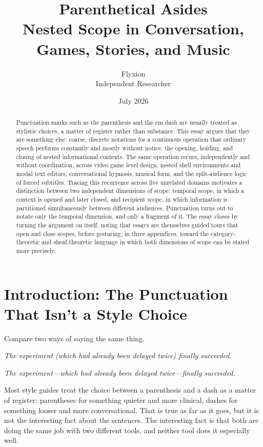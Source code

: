 \documentclass[11pt]{article}
\title{\textbf{Parenthetical Asides} \\[0.3em]
       \large Nested Scope in Conversation, Games, Stories, and Music}
\author{Flyxion \\ \small Independent Researcher}
\date{July 2026}
\begin{document}
\maketitle

\begin{abstract}
Punctuation marks such as the parenthesis and the em dash are usually treated as stylistic choices, a matter of register rather than substance. This essay argues that they are something else: coarse, discrete notations for a continuous operation that ordinary speech performs constantly and mostly without notice, the opening, holding, and closing of nested informational contexts. The same operation recurs, independently and without coordination, across video game level design, nested shell environments and modal text editors, conversational hypnosis, musical form, and the split-audience logic of forced subtitles. Tracing this recurrence across five unrelated domains motivates a distinction between two independent dimensions of scope: temporal scope, in which a context is opened and later closed, and recipient scope, in which information is partitioned simultaneously between different audiences. Punctuation turns out to notate only the temporal dimension, and only a fragment of it. The essay closes by turning the argument on itself, noting that essays are themselves guided tours that open and close scopes, before gesturing, in three appendices, toward the category-theoretic and sheaf-theoretic language in which both dimensions of scope can be stated more precisely.
\end{abstract}

\section{Introduction: The Punctuation That Isn't a Style Choice}

Compare two ways of saying the same thing.

\emph{The experiment (which had already been delayed twice) finally succeeded.}

\emph{The experiment---which had already been delayed twice---finally succeeded.}

Most style guides treat the choice between a parenthesis and a dash as a matter of register: parentheses for something quieter and more clinical, dashes for something looser and more conversational. That is true as far as it goes, but it is not the interesting fact about the sentences. The interesting fact is that both are doing the same job with two different tools, and neither tool does it especially well.
\end{document}
